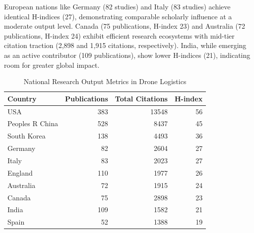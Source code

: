 \documentclass{article}
\begin{document}
European nations like Germany (82 studies) and Italy (83 studies) achieve identical H-indices (27), demonstrating comparable scholarly influence at a moderate output level. Canada (75 publications, H-index 23) and Australia (72 publications, H-index 24) exhibit efficient research ecosystems with mid-tier citation traction (2,898 and 1,915 citations, respectively). India, while emerging as an active contributor (109 publications), show lower H-indices (21), indicating room for greater global impact.


\begin{table}[htbp]
  \centering
  \caption{National Research Output Metrics in Drone Logistics}
  \label{tab:research_metrics}
  \begin{tabularx}{0.9\textwidth}{@{} >{\RaggedRight}p{3cm} r r r @{}}
    \toprule
    \textbf{Country} & \textbf{Publications} & \textbf{Total Citations} & \textbf{H-index} \\
    \midrule
    USA              & 383  & 13548 & 56 \\
    Peoples R China  & 528  & 8437  & 45 \\
    South Korea      & 138  & 4493  & 36 \\
    Germany          & 82   & 2604  & 27 \\
    Italy            & 83   & 2023  & 27 \\
    England          & 110  & 1977  & 26 \\
    Australia        & 72   & 1915  & 24 \\
    Canada           & 75   & 2898  & 23 \\
    India            & 109  & 1582  & 21 \\
    Spain            & 52   & 1388  & 19 \\
    \bottomrule
  \end{tabularx}
\end{table}
\end{document}
